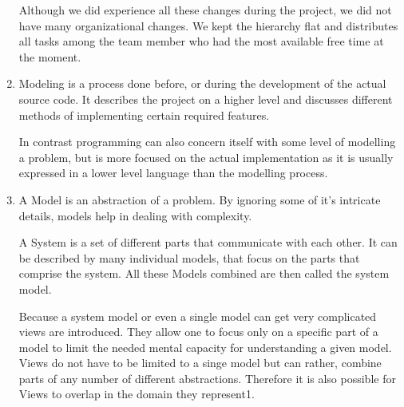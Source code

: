 \documentclass[a4paper, 10pt]{article}
\begin{document}
\begin{enumerate}
	      Although we did experience all these changes during the project, we did not have many organizational changes.
	      We kept the hierarchy flat and distributes all tasks among the team member who had the most
	      available free time at the moment.
	\item
	      Modeling is a process done before, or during the development of the
	      actual source code. It describes the project on a higher level and discusses
	      different methods of implementing certain required features.

	      In contrast programming can also concern itself with some level of modelling a problem, but
	      is more focused on the actual implementation as it is usually expressed in a lower level language than
	      the modelling process.
	\item
		A Model is an abstraction of a problem. By ignoring some of it's intricate details, models help in dealing
		with complexity.

		A System is a set of different parts that communicate with each other. It can be described by many individual models, 
		that focus on the parts that comprise the system. All these Models combined are then called the system model. 

		Because a system model or even a single model can get very complicated views are introduced. They allow one to focus 
		only on a specific part of a model to limit the needed mental capacity for understanding a given model.
		Views do not have to be limited to a singe model but can rather, combine parts of any number of different abstractions.
		Therefore it is also possible for Views to overlap in the domain they represent1.
\end{enumerate}
\end{document}
